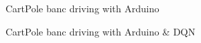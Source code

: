 \documentclass[12pt,serif,mathserif,compress]{beamer}
\begin{document}
\begin{frame}{CartPole banc driving with Arduino}
  
\end{frame}

\begin{frame}{CartPole banc driving with Arduino \& DQN}
  
\end{frame}
\end{document}
